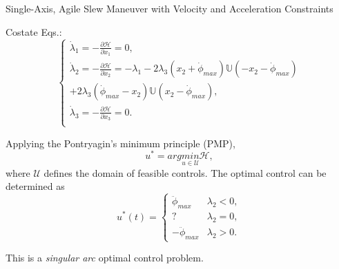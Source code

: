 \documentclass{beamer}
\newcounter{saveenumi}
\newcommand{\seti}{\setcounter{saveenumi}{\value{enumi}}}
\newcommand{\conti}{\setcounter{enumi}{\value{saveenumi}}}
\begin{document}
\begin{frame}
\begin{block}{ Single-Axis, Agile Slew Maneuver with Velocity and Acceleration Constraints}
\begin{enumerate}
\conti
\small{
\item Costate Eqs.:
\begin{equation}
\left\{\begin{array}{l}
               \dot{\lambda}_1=-\frac{\partial{\mathscr{H}}}{\partial{x_1}}=0,\\
               \dot{\lambda}_2=-\frac{\partial{\mathscr{H}}}{\partial{x_2}}=-\lambda_1-2\lambda_3(x_2+\dot{\phi}_{max})\mathbb{U}(-x_2-\dot{\phi}_{max})\\
+2\lambda_3(\dot{\phi}_{max}-x_2)\mathbb{U}(x_2-\dot{\phi}_{max}),\\
              \dot{\lambda}_3=-\frac{\partial{\mathscr{H}}}{\partial{x_3}}=0.\\
                \end{array}
              \right.
\end{equation}
\item Applying the Pontryagin's minimum principle (PMP),
\begin{equation}
u^*=arg \underset{u\in\mathcal{U}}{min} \mathscr{H},
\end{equation}
where $\mathcal{U}$ defines the domain of feasible controls. The optimal control can be determined as
\begin{equation}
u^*(t)=\left\{
                \begin{array}{lI}
           \ddot{\phi}_{max}&\lambda_2<0,\\
           ?& \lambda_2=0,\\
           -\ddot{\phi}_{max}&\lambda_2>0.
                \end{array}
              \right.
\end{equation}
 }
\end{enumerate}
\seti
This is a {\it singular arc} optimal control problem.
\end{block}
\end{frame}
\end{document}
